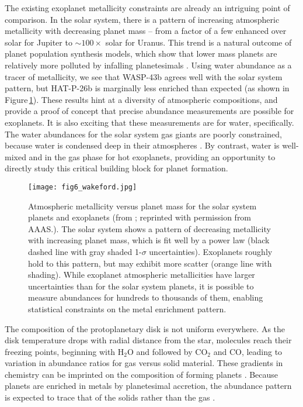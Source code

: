 \documentclass[graybox,natbib,nosecnum]{svmult}
\begin{document}
The existing exoplanet metallicity constraints are already an intriguing point of comparison. In the solar system, there is a pattern of increasing atmospheric metallicity with decreasing planet mass  -- from a factor of a few enhanced over solar for Jupiter to $\sim100\times$ solar for Uranus. This trend is a natural outcome of planet population synthesis models, which show that lower mass planets are relatively more polluted by infalling planetesimals \citep{fortney13, mordasini16}. Using water abundance as a tracer of metallicity, we see that WASP-43b agrees well with the solar system pattern, but HAT-P-26b is marginally less enriched than expected (as shown in Figure\,\ref{fig:massZ}).  These results hint at a diversity of atmospheric compositions, and provide a proof of concept that precise abundance measurements are possible for exoplanets. It is also exciting that these measurements are for water, specifically. The water abundances for the solar system gas giants are poorly constrained, because water is condensed deep in their atmospheres \citep{showman98, mousis14}. By contrast, water is well-mixed and in the gas phase for hot exoplanets, providing an opportunity to directly study this critical building block for planet formation.

 
\begin{figure}
\begin{centering}
\texttt{[image: fig6\_wakeford.jpg]}
\caption{Atmospheric metallicity versus planet mass for the solar system planets and exoplanets (from \citealt{wakeford17}; reprinted with permission from AAAS.). The solar system shows a pattern of decreasing metallicity with increasing planet mass, which is fit well by a power law (black dashed line with gray shaded 1-$\sigma$ uncertainties). Exoplanets roughly hold to this pattern, but may exhibit more scatter (orange line with shading). While exoplanet atmospheric metallicities have larger uncertainties than for the solar system planets, it is possible to measure abundances for hundreds to thousands of them, enabling statistical constraints on the metal enrichment pattern.} 
\label{fig:massZ}       
\end{centering}
\end{figure}

The composition of the protoplanetary disk is not uniform everywhere. As the disk temperature drops with radial distance from the star, molecules reach their freezing points, beginning with H$_2$O and followed by CO$_2$ and CO, leading to variation in abundance ratios for gas versus solid material. These gradients in chemistry can be imprinted on the composition of forming planets \citep[e.g.][]{oberg11, madhusudhan14, alidib16}. Because planets are enriched in metals by planetesimal accretion, the abundance pattern is expected to trace that of the solids rather than the gas \citep{mordasini16, espinoza17}.
\end{document}

